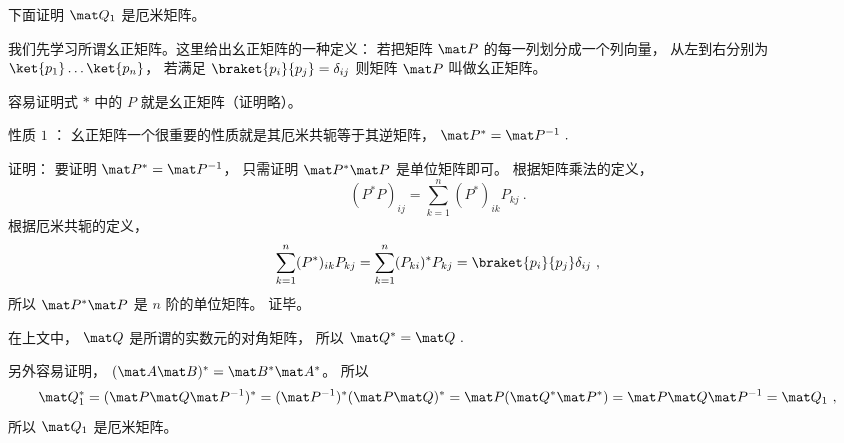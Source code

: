 下面证明 $\mat Q_1$ 是厄米矩阵。

我们先学习所谓幺正矩阵。这里给出幺正矩阵的一种定义： 若把矩阵 $\mat P$ 的每一列划分成一个列向量， 从左到右分别为$\ket{p_1} \dots\ket{p_n}$，  若满足 $\braket{p_i}{p_j}=\delta_{ij}$ 则矩阵 $\mat P$ 叫做幺正矩阵。

容易证明式 $*$ 中的 $P$ 就是幺正矩阵（证明略）。

性质 $1$ ： 幺正矩阵一个很重要的性质就是其厄米共轭等于其逆矩阵， $\mat P^* = \mat P^{- 1}~.$

证明： 要证明 $\mat P^* = \mat P^{-1}$，  只需证明 $\mat P^* \mat P$ 是单位矩阵即可。 根据矩阵乘法的定义，
\begin{equation}
(P^* P)_{ij} = \sum_{k=1}^n (P^*)_{ik}P_{kj}~.
\end{equation}
根据厄米共轭的定义，
\begin{equation}
\sum_{k=1}^n (P^*)_{ik}P_{kj}  = \sum_{k=1}^n (P_{ki})^* P_{kj}  = \braket{p_i}{p_j} \delta_{ij}~,
\end{equation}
所以 $\mat P^* \mat P$ 是 $n$ 阶的单位矩阵。  证毕。

在上文中， $\mat Q$ 是所谓的实数元的对角矩阵， 所以 $\mat Q^* = \mat Q~.$

另外容易证明， $(\mat A\mat B)^* = \mat B^* \mat A^*$。  所以
\begin{equation}
\mat Q_1^* = (\mat P\mat Q\mat P^{-1})^* = (\mat P^{-1})^* (\mat P\mat Q)^* = \mat P(\mat Q^* \mat P^*) = \mat P\mat Q\mat P^{-1} = \mat Q_1~,
\end{equation}
所以 $\mat Q_1$ 是厄米矩阵。


